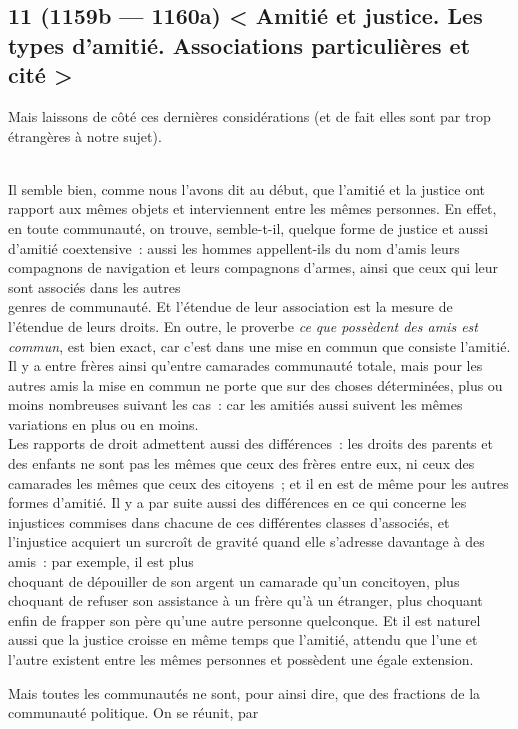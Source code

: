 \documentclass[french,twoside]{book} %
\begin{document}
\subsection[{11 (1159b — 1160a) < Amitié et justice. Les types d’amitié. Associations particulières et cité >}]{11 (1159b — 1160a) < Amitié et justice. Les types d’amitié. Associations particulières et cité >}
\noindent Mais laissons de côté ces dernières considérations (et de fait elles sont par trop étrangères à notre sujet).\par
\\
Il semble bien, comme nous l’avons dit au début, que l’amitié et la justice ont rapport aux mêmes objets et interviennent entre les mêmes personnes. En effet, en toute communauté, on trouve, semble-t-il, quelque forme de justice et aussi d’amitié coextensive : aussi les hommes appellent-ils du nom d’amis leurs compagnons de navigation et leurs compagnons d’armes, ainsi que ceux qui leur sont associés dans les autres \\
genres de communauté. Et l’étendue de leur association est la mesure de l’étendue de leurs droits. En outre, le proverbe {\itshape ce que possèdent des amis est commun}, est bien exact, car c’est dans une mise en commun que consiste l’amitié. Il y a entre frères ainsi qu’entre camarades communauté totale, mais pour les autres amis la mise en commun ne porte que sur des choses déterminées, plus ou moins nombreuses suivant les cas : car les amitiés aussi suivent les mêmes variations en plus ou en moins. \\
Les rapports de droit admettent aussi des différences : les  droits des parents et des enfants ne sont pas les mêmes que ceux des frères entre eux, ni ceux des camarades les mêmes que ceux des citoyens ; et il en est de même pour les autres formes d’amitié. Il y a par suite aussi des différences en ce qui concerne les injustices commises dans chacune de ces différentes classes d’associés, et l’injustice acquiert un surcroît de gravité quand elle s’adresse davantage à des amis : par exemple, il est plus \\
choquant de dépouiller de son argent un camarade qu’un concitoyen, plus choquant de refuser son assistance à un frère qu’à un étranger, plus choquant enfin de frapper son père qu’une autre personne quelconque. Et il est naturel aussi que la justice croisse en même temps que l’amitié, attendu que l’une et l’autre existent entre les mêmes personnes et possèdent une égale extension.\par
Mais toutes les communautés ne sont, pour ainsi dire, que des fractions de la communauté politique. On se réunit, par \\
\end{document}
